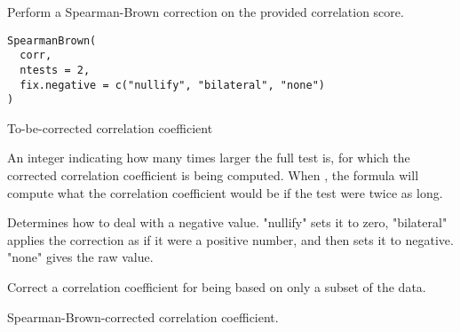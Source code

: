 \documentclass[a4paper]{book}
\begin{document}
%
\begin{Description}\relax
Perform a Spearman-Brown correction on the provided correlation score.
\end{Description}
%
\begin{Usage}
\begin{verbatim}
SpearmanBrown(
  corr,
  ntests = 2,
  fix.negative = c("nullify", "bilateral", "none")
)
\end{verbatim}
\end{Usage}
%
\begin{Arguments}
\begin{ldescription}
\item[\code{corr}] To-be-corrected correlation coefficient

\item[\code{ntests}] An integer indicating how many times larger the full test is, for which the corrected correlation coefficient is being computed.
When , the formula will compute what the correlation coefficient would be if the test were twice as long.

\item[\code{fix.negative}] Determines how to deal with a negative value. "nullify" sets it to zero,
"bilateral" applies the correction as if it were a positive number, and then sets it to negative. "none" gives the raw value.
\end{ldescription}
\end{Arguments}
%
\begin{Details}\relax
Correct a correlation coefficient for being based on only a subset of the data.
\end{Details}
%
\begin{Value}
Spearman-Brown-corrected correlation coefficient.
\end{Value}
\printindex{}
\end{document}
